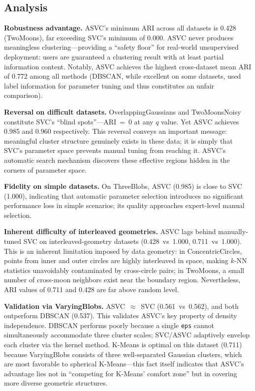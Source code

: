 \subsection{Analysis}

\textbf{Robustness advantage.} ASVC's minimum ARI across all datasets is 0.428 (TwoMoons), far exceeding SVC's minimum of 0.000. ASVC never produces meaningless clustering---providing a ``safety floor'' for real-world unsupervised deployment: users are guaranteed a clustering result with at least partial information content. Notably, ASVC achieves the highest cross-dataset mean ARI of 0.772 among all methods (DBSCAN, while excellent on some datasets, used label information for parameter tuning and thus constitutes an unfair comparison).

\textbf{Reversal on difficult datasets.} OverlappingGaussians and TwoMoonsNoisy constitute SVC's ``blind spots''---ARI~=~0 at any $q$ value. Yet ASVC achieves 0.985 and 0.960 respectively. This reversal conveys an important message: meaningful cluster structure genuinely exists in these data; it is simply that SVC's parameter space prevents manual tuning from reaching it. ASVC's automatic search mechanism discovers these effective regions hidden in the corners of parameter space.

\textbf{Fidelity on simple datasets.} On ThreeBlobs, ASVC (0.985) is close to SVC (1.000), indicating that automatic parameter selection introduces no significant performance loss in simple scenarios; its quality approaches expert-level manual selection.

\textbf{Inherent difficulty of interleaved geometries.} ASVC lags behind manually-tuned SVC on interleaved-geometry datasets (0.428~vs~1.000, 0.711~vs~1.000). This is an inherent limitation imposed by data geometry: in ConcentricCircles, points from inner and outer circles are highly interleaved in space, making $k$-NN statistics unavoidably contaminated by cross-circle pairs; in TwoMoons, a small number of cross-moon neighbors exist near the boundary region. Nevertheless, ARI values of 0.711 and 0.428 are far above random level.

\textbf{Validation via VaryingBlobs.} ASVC~$\approx$~SVC (0.561~vs~0.562), and both outperform DBSCAN (0.537). This validates ASVC's key property of density independence. DBSCAN performs poorly because a single \texttt{eps} cannot simultaneously accommodate three cluster scales; SVC/ASVC adaptively envelop each cluster via the kernel method. K-Means is optimal on this dataset (0.711) because VaryingBlobs consists of three well-separated Gaussian clusters, which are most favorable to spherical K-Means---this fact itself indicates that ASVC's advantage lies not in ``competing for K-Means' comfort zone'' but in covering more diverse geometric structures.

